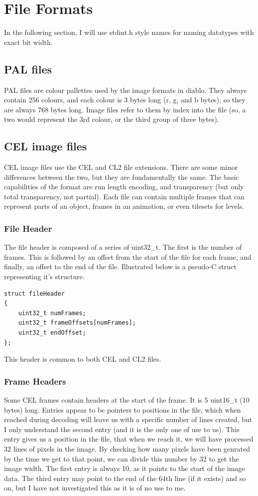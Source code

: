\documentclass[a4paper]{article}
\begin{document}
\section{File Formats}
In the following section, I will use stdint.h style names for naming datatypes with exact bit width.

\subsection{PAL files}
    PAL files are colour pallettes used by the image formats in diablo. They always contain 256 colours, and each colour is 3 bytes long (r, g, and b bytes), so they are always 768 bytes long. Image files refer to them by index into the file (so, a two would represent the 3rd colour, or the third group of three bytes).

\subsection{CEL image files}
	CEL image files use the CEL and CL2 file extensions. There are some minor differences between the two, but they are fundamentally the same. The basic capabilities of the format are run length encoding, and transparency (but only total transparency, not partial). Each file can contain multiple frames that can represent parts of an object, frames in an animation, or even tilesets for levels.

	\subsubsection{File Header}
	\label{sec:fileheaders}
	The file header is composed of a series of uint32\_t. The first is the number of frames. This is followed by an offset from the start of the file for each frame, and finally, an offset to the end of the file. Illustrated below is a pseudo-C struct representing it's structure.
	\begin{lstlisting}
struct fileHeader
{
	uint32_t numFrames;
	uint32_t frameOffsets[numFrames];
	uint32_t endOffset;
};
	\end{lstlisting}
	 This header is common to both CEL and CL2 files.
	 
	\subsubsection{Frame Headers}
	\label{sec:frameheaders}
	Some CEL frames contain headers at the start of the frame. It is 5 uint16\_t (10 bytes) long. Entries appear to be pointers to positions in the file, which when reached during decoding will leave us with a specific number of lines created, but I only understand the second entry (and it is the only one of use to us). This entry gives us a position in the file, that when we reach it, we will have processed 32 lines of pixels in the image. By checking how many pixels have been genrated by the time we get to that point, we can divide this number by 32 to get the image width.
	The first entry is always 10, as it points to the start of the image data.
	The third entry may point to the end of the 64th line (if it exists) and so on, but I have not investigated this as it is of no use to me.
	
\end{document}
